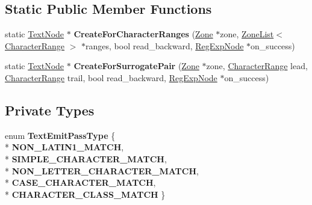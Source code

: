 \subsection*{Static Public Member Functions}
\begin{DoxyCompactItemize}
\item 
static \hyperlink{classv8_1_1internal_1_1_text_node}{Text\+Node} $\ast$ {\bfseries Create\+For\+Character\+Ranges} (\hyperlink{classv8_1_1internal_1_1_zone}{Zone} $\ast$zone, \hyperlink{classv8_1_1internal_1_1_zone_list}{Zone\+List}$<$ \hyperlink{classv8_1_1internal_1_1_character_range}{Character\+Range} $>$ $\ast$ranges, bool read\+\_\+backward, \hyperlink{classv8_1_1internal_1_1_reg_exp_node}{Reg\+Exp\+Node} $\ast$on\+\_\+success)\hypertarget{classv8_1_1internal_1_1_text_node_a2c57564acecae1ebaf9d4c4a53f769ba}{}\label{classv8_1_1internal_1_1_text_node_a2c57564acecae1ebaf9d4c4a53f769ba}

\item 
static \hyperlink{classv8_1_1internal_1_1_text_node}{Text\+Node} $\ast$ {\bfseries Create\+For\+Surrogate\+Pair} (\hyperlink{classv8_1_1internal_1_1_zone}{Zone} $\ast$zone, \hyperlink{classv8_1_1internal_1_1_character_range}{Character\+Range} lead, \hyperlink{classv8_1_1internal_1_1_character_range}{Character\+Range} trail, bool read\+\_\+backward, \hyperlink{classv8_1_1internal_1_1_reg_exp_node}{Reg\+Exp\+Node} $\ast$on\+\_\+success)\hypertarget{classv8_1_1internal_1_1_text_node_aefd5384ec49a85b2199bb1c56246c38c}{}\label{classv8_1_1internal_1_1_text_node_aefd5384ec49a85b2199bb1c56246c38c}

\end{DoxyCompactItemize}
\subsection*{Private Types}
\begin{DoxyCompactItemize}
\item 
enum {\bfseries Text\+Emit\+Pass\+Type} \{ \\*
{\bfseries N\+O\+N\+\_\+\+L\+A\+T\+I\+N1\+\_\+\+M\+A\+T\+CH}, 
\\*
{\bfseries S\+I\+M\+P\+L\+E\+\_\+\+C\+H\+A\+R\+A\+C\+T\+E\+R\+\_\+\+M\+A\+T\+CH}, 
\\*
{\bfseries N\+O\+N\+\_\+\+L\+E\+T\+T\+E\+R\+\_\+\+C\+H\+A\+R\+A\+C\+T\+E\+R\+\_\+\+M\+A\+T\+CH}, 
\\*
{\bfseries C\+A\+S\+E\+\_\+\+C\+H\+A\+R\+A\+C\+T\+E\+R\+\_\+\+M\+A\+T\+CH}, 
\\*
{\bfseries C\+H\+A\+R\+A\+C\+T\+E\+R\+\_\+\+C\+L\+A\+S\+S\+\_\+\+M\+A\+T\+CH}
 \}\hypertarget{classv8_1_1internal_1_1_text_node_a2921629ef1cfb577737b8386b8bee7c5}{}\label{classv8_1_1internal_1_1_text_node_a2921629ef1cfb577737b8386b8bee7c5}

\end{DoxyCompactItemize}
